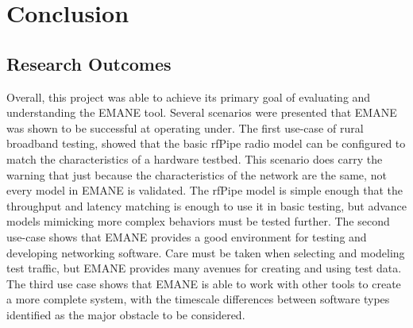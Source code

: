 \chapter{Conclusion}
\label{conclusion}
\section{Research Outcomes}
Overall, this project was able to achieve its primary goal of evaluating and understanding the EMANE tool.
Several scenarios were presented that EMANE was shown to be successful at operating under.
The first use-case of rural broadband testing, showed that the basic rfPipe radio model can be configured to match the characteristics of a hardware testbed.
This scenario does carry the warning that just because the characteristics of the network are the same, not every model in EMANE is validated.
The rfPipe model is simple enough that the throughput and latency matching is enough to use it in basic testing, but advance models mimicking more complex behaviors must be tested further.
The second use-case shows that EMANE provides a good environment for testing and developing networking software.
Care must be taken when selecting and modeling test traffic, but EMANE provides many avenues for creating and using test data.
The third use case shows that EMANE is able to work with other tools to create a more complete system, with the timescale differences between software types identified as the major obstacle to be considered.

